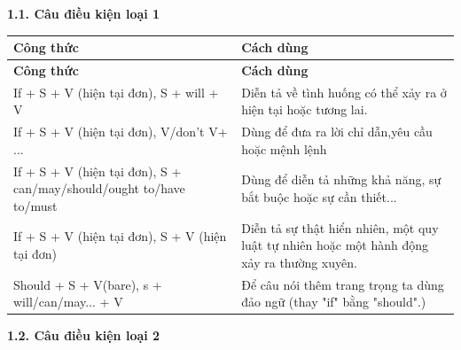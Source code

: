 \documentclass[12pt,a4paper,twoside]{article}
\begin{document}
\par\noindent\textbf{\large 1.1. Câu điều kiện loại 1}\par\vspace{2pt}
{\small
\renewcommand{\arraystretch}{1.25}
\begin{longtable}{|>{\raggedright\arraybackslash}p{}|>{\raggedright\arraybackslash}p{}|}
\hline
\rowcolor{pastelBlue}
\textbf{Công thức} & \textbf{Cách dùng} \\
\hline
\endfirsthead
\hline
\rowcolor{pastelBlue}
\textbf{Công thức} & \textbf{Cách dùng} \\
\hline
\endhead
\endfoot
\endlastfoot
If + S + V (hiện tại đơn), S + will + V & Diễn tả về tình huống có thể xảy ra ở hiện tại hoặc tương lai. \\
\hline
If + S + V (hiện tại đơn), V/don't V+ ... & Dùng để đưa ra lời chỉ dẫn,\newline yêu cầu hoặc mệnh lệnh \\
\hline
If + S + V (hiện tại đơn), S + can/may/should/ought to/have to/must & Dùng để diễn tả những khả năng, sự bắt buộc hoặc sự cần thiết... \\
\hline
If + S + V (hiện tại đơn), S + V (hiện tại đơn) & Diễn tả sự thật hiển nhiên, một quy luật tự nhiên hoặc một hành động xảy ra thường xuyên. \\
\hline
Should + S + V(bare), s + will/can/may... + V & Để câu nói thêm trang trọng ta dùng đảo ngữ (thay "if" bằng "should".) \\
\hline
\end{longtable}
}
\par\noindent\textbf{\large 1.2. Câu điều kiện loại 2}\par\vspace{2pt}
\end{document}
